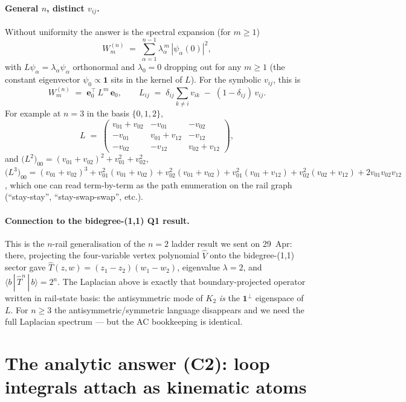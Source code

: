 \documentclass[11pt,a4paper]{article}
\begin{document}
\paragraph{General $n$, distinct $v_{ij}$.}
Without uniformity the answer is the spectral expansion (for $m\!\geq\!1$)
\begin{equation}\label{eq:spectral}
W^{(n)}_m \;=\; \sum_{\alpha=1}^{n-1}\lambda_\alpha^{\,m}\,|\psi_\alpha(0)|^{2},
\end{equation}
with $L\psi_\alpha=\lambda_\alpha\psi_\alpha$ orthonormal and $\lambda_0=0$
dropping out for any $m\!\geq\!1$ (the constant eigenvector $\psi_0\propto\mathbf 1$
sits in the kernel of $L$). For the symbolic $v_{ij}$, this is
\[
W^{(n)}_m \;=\; \mathbf{e}_0^{\top}\,L^{m}\,\mathbf{e}_0,
\qquad L_{ij} \;=\; \delta_{ij}\!\sum_{k\neq i}v_{ik}\;-\;(1-\delta_{ij})\,v_{ij}.
\]
For example at $n=3$ in the basis $\{0,1,2\}$,
\[
L \;=\; \begin{pmatrix}
v_{01}+v_{02} & -v_{01} & -v_{02}\\
-v_{01} & v_{01}+v_{12} & -v_{12}\\
-v_{02} & -v_{12} & v_{02}+v_{12}
\end{pmatrix},
\]
and $\big(L^2\big)_{00} = (v_{01}+v_{02})^{2}+v_{01}^{2}+v_{02}^{2}$,
$\big(L^3\big)_{00} = (v_{01}+v_{02})^{3}+v_{01}^{2}(v_{01}+v_{02})
+v_{02}^{2}(v_{01}+v_{02})+v_{01}^{2}(v_{01}+v_{12})
+v_{02}^{2}(v_{02}+v_{12})+2v_{01}v_{02}v_{12}$, which one can
read term-by-term as the path enumeration on the rail graph
(``stay-stay'', ``stay-swap-swap'', etc.).

\paragraph{Connection to the bidegree-(1,1) Q1 result.}
This is the $n$-rail generalisation of the $n{=}2$ ladder result we sent on
29~Apr: there, projecting the four-variable vertex polynomial $\widehat V$
onto the bidegree-(1,1) sector gave
$\widehat T(z,w)=(z_1-z_2)(w_1-w_2)$, eigenvalue $\lambda{=}2$, and
$\langle b\,|\,\widehat T^{n}\,|\,b\rangle = 2^{n}$. The Laplacian above is
exactly that boundary-projected operator written in rail-state basis: the
antisymmetric mode of $K_2$ \emph{is} the $\mathbf 1^{\perp}$ eigenspace of
$L$. For $n\!\geq\!3$ the antisymmetric/symmetric language disappears and we
need the full Laplacian spectrum --- but the AC bookkeeping is identical.

\section{The analytic answer (C2): loop integrals attach as kinematic atoms}
\end{document}
